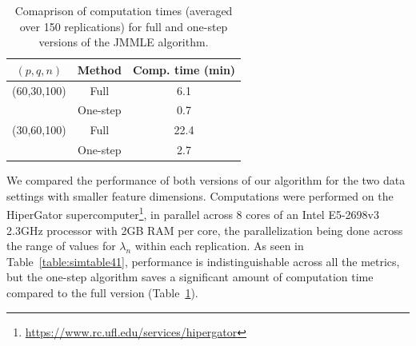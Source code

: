 %
\begin{table}[h!]
\centering
  \begin{tabular}{ccc}
    \hline
    $(p,q,n)$     & Method   & Comp. time (min) \\ \hline
    (60,30,100) & Full     & 6.1              \\ 
    ~           & One-step & 0.7              \\ \hline
    (30,60,100) & Full     & 22.4             \\ 
    ~           & One-step & 2.7              \\ \hline
    \end{tabular}
    \caption{Comaprison of computation times (averaged over 150 replications) for full and one-step versions of the JMMLE algorithm.}
    \label{table:simtable42}
\end{table}

We compared the performance of both versions of our algorithm for the two data settings with smaller feature dimensions. Computations were performed on the HiperGator supercomputer\footnote{\url{https://www.rc.ufl.edu/services/hipergator}}, in parallel across 8 cores of an Intel E5-2698v3 2.3GHz processor with 2GB RAM per core, the parallelization being done across the range of values for $\lambda_n$ within each replication. As seen in Table~\ref{table:simtable41}, performance is  indistinguishable across all the metrics, but the one-step algorithm saves a significant amount of computation time compared to the full version (Table~\ref{table:simtable42}).

